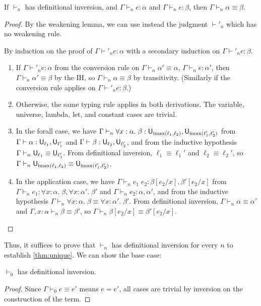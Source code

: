 \begin{theorem}\label{thm:utype}
If $\vdash_n$ has definitional inversion, and $\Gamma\vdash_n e:\alpha$ and $\Gamma\vdash_n e:\beta$, then $\Gamma\vdash_n\alpha\equiv\beta$.
\end{theorem}
\begin{proof}
By the weakening lemma, we can use instead the judgment $\vdash'_n$ which has no weakening rule.

By induction on the proof of $\Gamma\vdash'_n e:\alpha$ with a secondary induction on $\Gamma\vdash'_n e:\beta$.
\begin{enumerate}
\item If $\Gamma\vdash'_n e:\alpha$ from the conversion rule on $\Gamma\vdash_n\alpha'\equiv\alpha$, $\Gamma\vdash_n e:\alpha'$, then $\Gamma\vdash_n\alpha'\equiv\beta$ by the IH, so $\Gamma\vdash_n\alpha\equiv\beta$ by transitivity. (Similarly if the conversion rule applies on $\Gamma\vdash'_n e:\beta$.)
\item Otherwise, the same typing rule applies in both derivations. The variable, universe, lambda, let, and constant cases are trivial.
\item In the forall case, we have $\Gamma\vdash_n\forall x:\alpha.\;\beta:\U_{\imax(\ell_1,\ell_2)},\U_{\imax(\ell_1',\ell_2')}$ from $\Gamma\vdash\alpha:\U_{\ell_1},\U_{\ell_1'}$ and $\Gamma\vdash\beta:\U_{\ell_2},\U_{\ell_2'}$, and from the inductive hypothesis $\Gamma\vdash_n\U_{\ell_1}\equiv\U_{\ell_1'}$. From definitional inversion, $\ell_1\equiv \ell_1'$ and $\ell_2\equiv \ell_2'$, so $\Gamma\vdash_n\U_{\imax(\ell_1,\ell_2)}\equiv\U_{\imax(\ell_1',\ell_2')}$.
\item In the application case, we have $\Gamma\vdash_n e_1\;e_2:\beta[e_2/x],\beta'[e_2/x]$ from $\Gamma\vdash_n e_1:\forall x:\alpha.\;\beta,\forall x:\alpha'.\;\beta'$ and $\Gamma\vdash_n e_2:\alpha,\alpha'$, and from the inductive hypothesis $\Gamma\vdash_n\forall x:\alpha.\;\beta\equiv\forall x:\alpha'.\;\beta'$. From definitional inversion, $\Gamma\vdash_n\alpha\equiv\alpha'$ and $\Gamma,x:\alpha\vdash_n\beta\equiv\beta'$, so $\Gamma\vdash_n\beta[e_2/x]\equiv\beta'[e_2/x]$.
\end{enumerate}
\end{proof}

Thus, it suffices to prove that $\vdash_n$ has definitional inversion for every $n$ to establish \autoref{thm:unique}. We can show the base case:
\begin{lemma}\label{thm:0dinv}
$\vdash_0$ has definitional inversion.
\end{lemma}
\begin{proof}
Since $\Gamma\vdash_0 e\equiv e'$ means $e=e'$, all cases are trivial by inversion on the construction of the term.
\end{proof}

